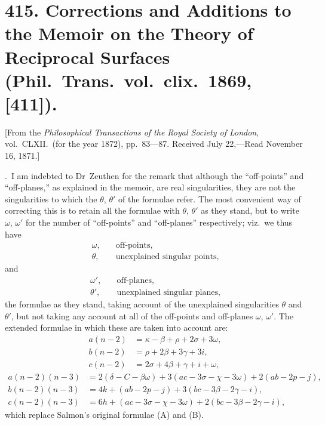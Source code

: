 \documentclass[11pt,a4paper]{article}
\theoremstyle{plain}
\theoremstyle{definition}
\theoremstyle{remark}
\begin{document}
\newpage
\setcounter{page}{605}


\section*{415. Corrections and Additions to the Memoir on the Theory of Reciprocal Surfaces (Phil.\ Trans.\ vol.~clix.\ 1869, [411]).}

\begin{flushright}
\small[From the \textit{Philosophical Transactions of the Royal Society of London}, vol.~CLXII.\ (for the year 1872), pp.~83---87. Received July 22,---Read November 16, 1871.]
\end{flushright}

\smallskip

.\ I am indebted to Dr~Zeuthen for the remark that although the ``off-points'' and ``off-planes,'' as explained in the memoir, are real singularities, they are not the singularities to which the $\theta$, $\theta'$ of the formulae refer. The most convenient way of correcting this is to retain all the formulae with $\theta$, $\theta'$ as they stand, but to write $\omega$, $\omega'$ for the number of ``off-points'' and ``off-planes'' respectively; viz.\ we thus have
\begin{align*}
\omega,&\quad \text{off-points},\\
\theta,&\quad \text{unexplained singular points},
\end{align*}
and
\begin{align*}
\omega',&\quad \text{off-planes},\\
\theta',&\quad \text{unexplained singular planes},
\end{align*}
the formulae as they stand, taking account of the unexplained singularities $\theta$ and $\theta'$, but not taking any account at all of the off-points and off-planes $\omega$, $\omega'$. The extended formulae in which these are taken into account are:
\begin{align}
a(n-2) &= \kappa-\beta+\rho+2\sigma+3\omega,\\
b(n-2) &= \rho+2\beta+3\gamma+3i,\\
c(n-2) &= 2\sigma+4\beta+\gamma+i+\omega,
\end{align}
\begin{align}
a(n-2)(n-3) &= 2(\delta-C-\beta\omega)+3(ac-3\sigma-\chi-3\omega)+2(ab-2p-j),\\
b(n-2)(n-3) &= 4k+(ab-2p-j)+3(bc-3\beta-2\gamma-i),\\
c(n-2)(n-3) &= 6h+(ac-3\sigma-\chi-3\omega)+2(bc-3\beta-2\gamma-i),
\end{align}
which replace Salmon's original formulae (A) and (B).
\end{document}
